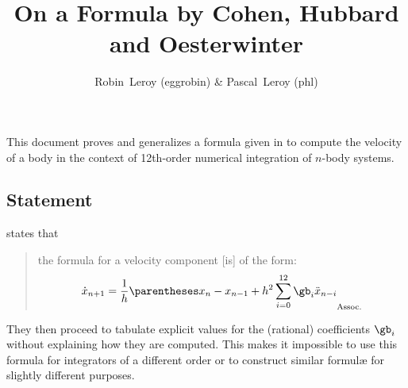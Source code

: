 \documentclass[10pt, a4paper, twoside]{basestyle}
\title{On a Formula by Cohen, Hubbard and Oesterwinter}
\date{\printdate{2021-03-13}}
\author{Robin~Leroy (eggrobin) \& Pascal~Leroy (phl)}
\begin{document}
\maketitle
\begin{sloppypar}
\noindent
This document proves and generalizes a formula given in \cite{CohenHubbardOesterwinter1973} to compute the velocity of a body in the context of 12th-order numerical integration of $n$-body systems.
\end{sloppypar}

\subsection*{Statement}
\cite{CohenHubbardOesterwinter1973} states that
\begin{quotation}
the formula for a velocity component [is] of the form:
\begin{equation}
\TimeDerivative{x}_{n + 1} = \frac{1}{h}\pa{x_n - x_{n - 1} + h^2 \sum{i = 0}[12] \gb_i \SecondTimeDerivative{x}_{n-i}}
\label{eqncho}
\end{equation}
\end{quotation}
They then proceed to tabulate explicit values for the (rational) coefficients $\gb_i$ without explaining how they are computed.  This makes it impossible to use this formula for integrators of a different order or to construct similar formulæ for slightly different purposes.
\end{document}

